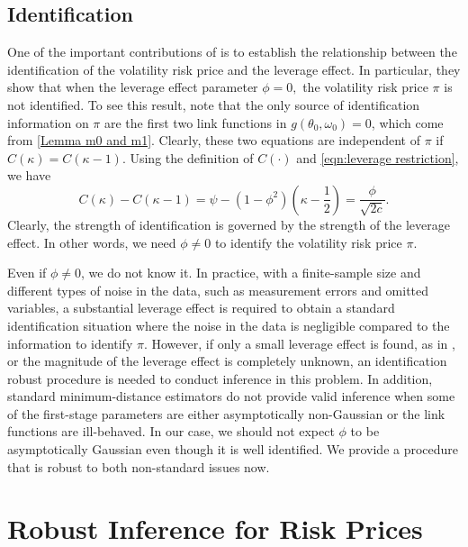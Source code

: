 \subsection{Identification}

One of the important contributions of \textcite{han2018leverage} is to establish the relationship between the identification of the volatility risk price and the leverage effect. In particular, they show that when the leverage effect parameter $\phi =0,$ the volatility risk price $\pi $ is not identified. To see this result, note that the only source of identification information on $\pi $ are the first two link functions in $g(\theta _{0},\omega _{0})=0$, which come from \cref{Lemma m0 and m1}. Clearly, these two equations are independent of $\pi$ if $C(\kappa )=C(\kappa -1)$. Using the definition of $C(\cdot)$ and \cref{eqn:leverage restriction}, we have 
%
\begin{equation}
    C(\kappa )-C(\kappa -1)=\psi -(1-\phi ^{2})\left( \kappa -\frac{1}{2}\right) = \frac{\phi}{\sqrt{2 c}}.
\end{equation}
%
Clearly, the strength of identification is governed by the strength of the leverage effect.
In other words, we need $\phi \neq 0$ to identify the volatility risk price $\pi$.

Even if $\phi \neq 0$, we do not know it. In practice, with a finite-sample size and different types of noise in the data, such as measurement errors and omitted variables, a substantial leverage effect is required to obtain a standard identification situation where the noise in the data is negligible compared to the information to identify $\pi$. However, if only a small leverage effect is found, as in \textcites{bandi2012timevarying, aitsahalia2013leverage}, or the magnitude of the leverage effect is completely unknown, an identification robust procedure is needed to conduct inference in this problem. In addition, standard minimum-distance estimators do not provide valid inference when some of the first-stage parameters are either asymptotically non-Gaussian or the link functions are ill-behaved. In our case, we should not expect $\phi$ to be asymptotically Gaussian even though it is well identified. We provide a procedure that is robust to both non-standard issues now.

\section{Robust Inference for Risk Prices}\label{sec:robust inference}

